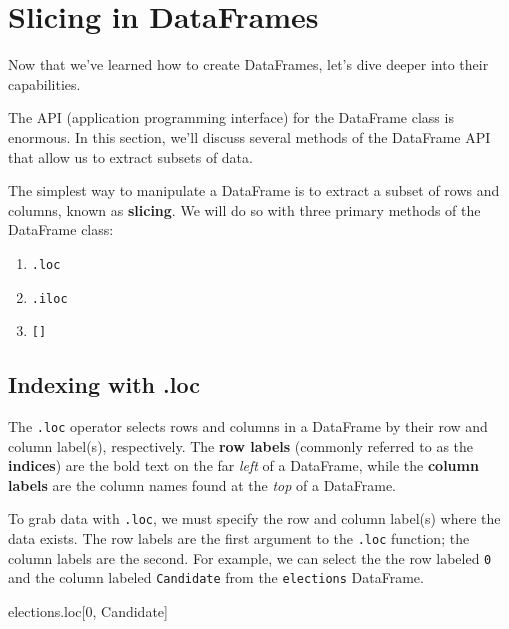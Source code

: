 \documentclass[
  letterpaper,
  DIV=11,
  numbers=noendperiod]{scrreprt}
\newenvironment{Shaded}{\begin{snugshade}}{\end{snugshade}}
\newcommand{\DecValTok}[1]{\textcolor[rgb]{0.68,0.00,0.00}{#1}}
\newcommand{\NormalTok}[1]{\textcolor[rgb]{0.00,0.23,0.31}{#1}}
\newcommand{\StringTok}[1]{\textcolor[rgb]{0.13,0.47,0.30}{#1}}
\providecommand{\tightlist}{%
  \setlength{\itemsep}{0pt}\setlength{\parskip}{0pt}}\usepackage{longtable,booktabs,array}
\begin{document}
\hypertarget{slicing-in-dataframes}{%
\section{Slicing in DataFrames}\label{slicing-in-dataframes}}

Now that we've learned how to create DataFrames, let's dive deeper into
their capabilities.

The API (application programming interface) for the DataFrame class is
enormous. In this section, we'll discuss several methods of the
DataFrame API that allow us to extract subsets of data.

The simplest way to manipulate a DataFrame is to extract a subset of
rows and columns, known as \textbf{slicing}. We will do so with three
primary methods of the DataFrame class:

\begin{enumerate}
\def\labelenumi{\arabic{enumi}.}
\tightlist
\item
  \texttt{.loc}
\item
  \texttt{.iloc}
\item
  \texttt{{[}{]}}
\end{enumerate}

\hypertarget{indexing-with-.loc}{%
\subsection{Indexing with .loc}\label{indexing-with-.loc}}

The \texttt{.loc} operator selects rows and columns in a DataFrame by
their row and column label(s), respectively. The \textbf{row labels}
(commonly referred to as the \textbf{indices}) are the bold text on the
far \emph{left} of a DataFrame, while the \textbf{column labels} are the
column names found at the \emph{top} of a DataFrame.

To grab data with \texttt{.loc}, we must specify the row and column
label(s) where the data exists. The row labels are the first argument to
the \texttt{.loc} function; the column labels are the second. For
example, we can select the the row labeled \texttt{0} and the column
labeled \texttt{Candidate} from the \texttt{elections} DataFrame.

\begin{Shaded}
\begin{Highlighting}[]
\NormalTok{elections.loc[}\DecValTok{0}\NormalTok{, }\StringTok{\textquotesingle{}Candidate\textquotesingle{}}\NormalTok{]}
\end{Highlighting}
\end{Shaded}
\end{document}
